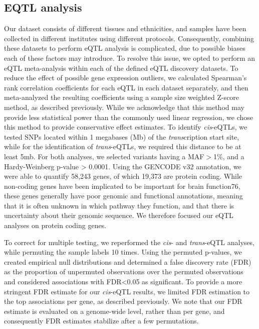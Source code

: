 {\subsection{EQTL analysis}
Our dataset consists of different tissues and ethnicities, and samples have been collected in different institutes using different protocols. Consequently, combining these datasets to perform eQTL analysis is complicated, due to possible biases each of these factors may introduce. To resolve this issue, we opted to perform an eQTL meta-analysis within each of the defined eQTL discovery datasets. To reduce the effect of possible gene expression outliers, we calculated Spearman’s rank correlation coefficients for each eQTL in each dataset separately, and then meta-analyzed the resulting coefficients using a sample size weighted Z-score method, as described previously\cite{vosaUnravelingPolygenicArchitecture2018}. While we acknowledge that this method may provide less statistical power than the commonly used linear regression, we chose this method to provide conservative effect estimates. To identify \emph{cis}-eQTLs, we tested SNPs located within 1 megabases (Mb) of the \emph{trans}cription start site, while for the identification of \emph{trans}-eQTLs, we required this distance to be at least 5mb. For both analyses, we selected variants having a MAF$>$1\%, and a Hardy-Weinberg p-value > 0.0001. Using the GENCODE v32 annotation, we were able to quantify 58,243 genes, of which 19,373 are protein coding. While non-coding genes have been implicated to be important for brain function76, these genes generally have poor genomic and functional annotations, meaning that it is often unknown in which pathway they function, and that there is uncertainty about their genomic sequence. We therefore focused our eQTL analyses on protein coding genes. 

To correct for multiple testing, we reperformed the \emph{cis}- and \emph{trans}-eQTL analyses, while permuting the sample labels 10 times. Using the permuted p-values, we created empirical null distributions and determined a false discovery rate (FDR) as the proportion of unpermuted observations over the permuted observations and considered associations with FDR<0.05 as significant. To provide a more stringent FDR estimate for our \emph{cis}-eQTL results, we limited FDR estimation to the top associations per gene, as described previously\cite{vosaUnravelingPolygenicArchitecture2018}. We note that our FDR estimate is evaluated on a genome-wide level, rather than per gene, and consequently FDR estimates stabilize after a few permutations\cite{westraSystematicIdentificationTrans2013}. 

}
